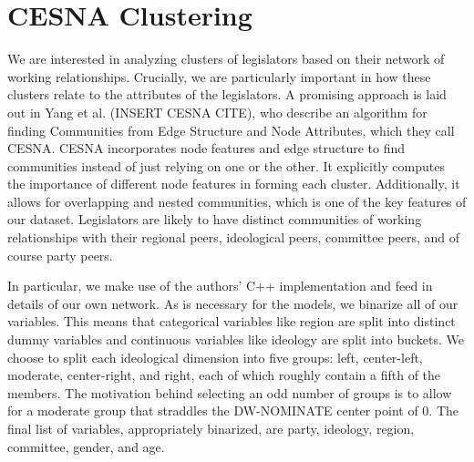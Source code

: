 \section{CESNA Clustering}

We are interested in analyzing clusters of legislators based on their network of working relationships. Crucially, we are particularly important in how these clusters relate to the attributes of the legislators. A promising approach is laid out in Yang et al. (INSERT CESNA CITE), who describe an algorithm for finding Communities from Edge Structure and Node Attributes, which they call CESNA. CESNA incorporates node features and edge structure to find communities instead of just relying on one or the other. It explicitly computes the importance of different node features in forming each cluster. Additionally, it allows for overlapping and nested communities, which is one of the key features of our dataset. Legislators are likely to have distinct communities of working relationships with their regional peers, ideological peers, committee peers, and of course party peers. 

In particular, we make use of the authors' C++ implementation and feed in details of our own network. As is necessary for the models, we binarize all of our variables. This means that categorical variables like region are split into distinct dummy variables and continuous variables like ideology are split into buckets. We choose to split each ideological dimension into five groups: left, center-left, moderate, center-right, and right, each of which roughly contain a fifth of the members. The motivation behind selecting an odd number of groups is to allow for a moderate group that straddles the DW-NOMINATE center point of 0. The final list of variables, appropriately binarized, are party, ideology, region, committee, gender, and age.